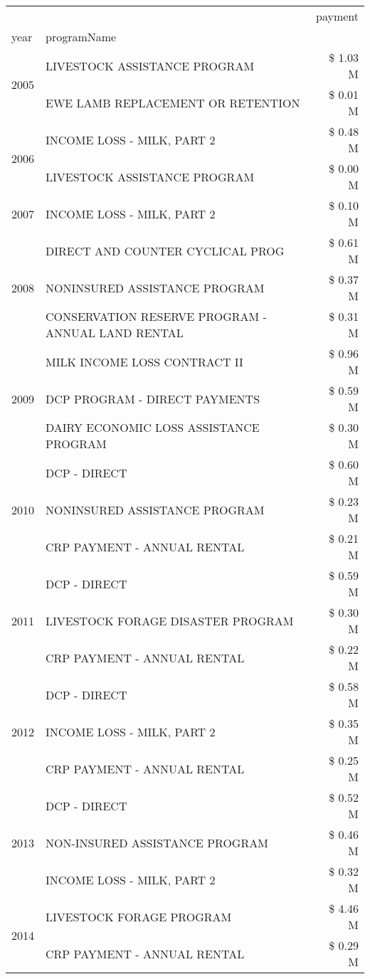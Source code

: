 \begin{tabular}{llr}
\toprule
 &  & payment \\
year & programName &  \\
\midrule
\multirow[t]{2}{*}{2005} & LIVESTOCK ASSISTANCE PROGRAM & \$ 1.03 M \\
 & EWE LAMB REPLACEMENT OR RETENTION & \$ 0.01 M \\
\cline{1-3}
\multirow[t]{2}{*}{2006} & INCOME LOSS - MILK, PART 2 & \$ 0.48 M \\
 & LIVESTOCK ASSISTANCE PROGRAM & \$ 0.00 M \\
\cline{1-3}
2007 & INCOME LOSS - MILK, PART 2 & \$ 0.10 M \\
\cline{1-3}
\multirow[t]{3}{*}{2008} & DIRECT AND COUNTER CYCLICAL PROG & \$ 0.61 M \\
 & NONINSURED ASSISTANCE PROGRAM & \$ 0.37 M \\
 & CONSERVATION RESERVE PROGRAM - ANNUAL LAND RENTAL & \$ 0.31 M \\
\cline{1-3}
\multirow[t]{3}{*}{2009} & MILK INCOME LOSS CONTRACT II & \$ 0.96 M \\
 & DCP PROGRAM - DIRECT PAYMENTS & \$ 0.59 M \\
 & DAIRY ECONOMIC LOSS ASSISTANCE PROGRAM & \$ 0.30 M \\
\cline{1-3}
\multirow[t]{3}{*}{2010} & DCP - DIRECT & \$ 0.60 M \\
 & NONINSURED ASSISTANCE PROGRAM & \$ 0.23 M \\
 & CRP PAYMENT - ANNUAL RENTAL & \$ 0.21 M \\
\cline{1-3}
\multirow[t]{3}{*}{2011} & DCP - DIRECT & \$ 0.59 M \\
 & LIVESTOCK FORAGE DISASTER PROGRAM & \$ 0.30 M \\
 & CRP PAYMENT - ANNUAL RENTAL & \$ 0.22 M \\
\cline{1-3}
\multirow[t]{3}{*}{2012} & DCP - DIRECT & \$ 0.58 M \\
 & INCOME LOSS - MILK, PART 2 & \$ 0.35 M \\
 & CRP PAYMENT - ANNUAL RENTAL & \$ 0.25 M \\
\cline{1-3}
\multirow[t]{3}{*}{2013} & DCP - DIRECT & \$ 0.52 M \\
 & NON-INSURED ASSISTANCE PROGRAM & \$ 0.46 M \\
 & INCOME LOSS - MILK, PART 2 & \$ 0.32 M \\
\cline{1-3}
\multirow[t]{3}{*}{2014} & LIVESTOCK FORAGE PROGRAM & \$ 4.46 M \\
 & CRP PAYMENT - ANNUAL RENTAL & \$ 0.29 M \\

\end{tabular}
